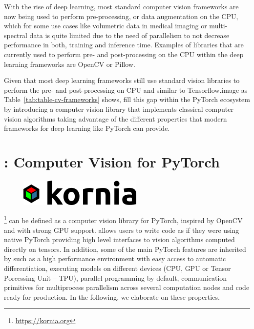 With the rise of deep learning, most standard computer vision frameworks are now being used to perform pre-processing, or data augmentation on the CPU, which for some use cases like volumetric data in medical imaging or multi-spectral data is quite limited due to the need of parallelism to not decrease performance in both, training and inference time. Examples of libraries that are currently used to perform pre- and post-processing on the CPU within the deep learning frameworks are OpenCV or Pillow.

Given that most  deep learning frameworks still use standard vision libraries to perform the pre- and post-processing on CPU and similar to Tensorflow.image {as Table~\ref{tab:table-cv-frameworks} shows, \lib{} fill this gap} within the PyTorch ecosystem by introducing a computer vision library that implements classical computer vision algorithms taking advantage of the different properties that modern frameworks for deep learning like PyTorch can provide.


\section{\lib: Computer Vision for PyTorch}
\label{section:kornia}

\begin{figure}[h]
\centering
\includegraphics[scale=0.30]{main/chapter03/data/kornia_logo.png}
\label{fig:kornia_logo}
\end{figure}

\lib\footnote{\url{https://kornia.org}} can be defined as a computer vision library for PyTorch, inspired by OpenCV and with strong GPU support. \lib{} allows users to write code as if they were using native PyTorch providing high level interfaces to vision algorithms computed directly on tensors. In addition, some of the main PyTorch features are inherited by \lib{} such as a high performance environment with easy access to automatic differentiation, executing models on different devices (CPU, GPU or Tensor Porcessing Unit -- TPU), parallel programming by default, communication primitives for multiprocess parallelism across several computation nodes and code ready for production. In the following, we elaborate on these properties.

